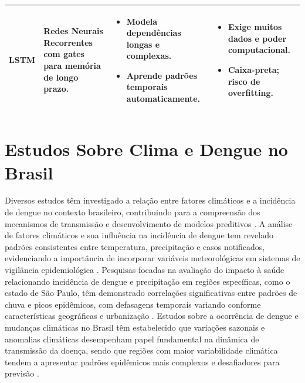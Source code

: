 \begin{table}[!ht]
\begin{tabular}{|p{}|p{}|p{}|p{}|}
    \textbf{LSTM} & Redes Neurais Recorrentes com gates para memória de longo prazo. & \begin{itemize}[leftmargin=*,noitemsep,topsep=0pt] \item Modela dependências longas e complexas. \item Aprende padrões temporais automaticamente. \end{itemize} & \begin{itemize}[leftmargin=*,noitemsep,topsep=0pt] \item Exige muitos dados e poder computacional. \item Caixa-preta; risco de overfitting. \end{itemize} \\ \hline
    \end{tabular}
\end{table}

\section{Estudos Sobre Clima e Dengue no Brasil}

Diversos estudos têm investigado a relação entre fatores climáticos e a incidência de dengue no contexto brasileiro, contribuindo para a compreensão dos mecanismos de transmissão e desenvolvimento de modelos preditivos \cite{the_occurrence_dengue_weather_brazil,analysis_climate_factors_dengue,health_impact_dengue_precipitation_sp}. A análise de fatores climáticos e sua influência na incidência de dengue tem revelado padrões consistentes entre temperatura, precipitação e casos notificados, evidenciando a importância de incorporar variáveis meteorológicas em sistemas de vigilância epidemiológica \cite{analysis_climate_factors_dengue}. Pesquisas focadas na avaliação do impacto à saúde relacionando incidência de dengue e precipitação em regiões específicas, como o estado de São Paulo, têm demonstrado correlações significativas entre padrões de chuva e picos epidêmicos, com defasagens temporais variando conforme características geográficas e urbanização \cite{health_impact_dengue_precipitation_sp}. Estudos sobre a ocorrência de dengue e mudanças climáticas no Brasil têm estabelecido que variações sazonais e anomalias climáticas desempenham papel fundamental na dinâmica de transmissão da doença, sendo que regiões com maior variabilidade climática tendem a apresentar padrões epidêmicos mais complexos e desafiadores para previsão \cite{the_occurrence_dengue_weather_brazil}.

